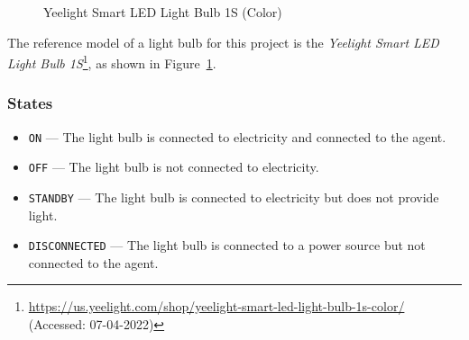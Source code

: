 \documentclass[letterpaper, 11pt]{Proposal}
\def\Fig#1{Figure~\ref{#1}}
\begin{document}
\begin{figure}
    \centering
    \caption{Yeelight Smart LED Light Bulb 1S (Color)}
    \label{fig:03_devices_lights_yeelight}
\end{figure}
The reference model of a light bulb for this project is the 
\textit{Yeelight Smart LED Light Bulb 1S}\footnote{\url{https://us.yeelight.com/shop/yeelight-smart-led-light-bulb-1s-color/} (Accessed: 07-04-2022)}, 
as shown in \Fig{fig:03_devices_lights_yeelight}.

\subsubsection{States}
\begin{itemize}
    \item \texttt{ON} --- The light bulb is connected to electricity and connected 
    to the agent.
    \item \texttt{OFF} --- The light bulb is not connected to electricity.
    \item \texttt{STANDBY} --- The light bulb is connected to electricity but 
    does not provide light.
    \item \texttt{DISCONNECTED} --- The light bulb is connected to a power source 
    but not connected to the agent.
\end{itemize}
\end{document}
